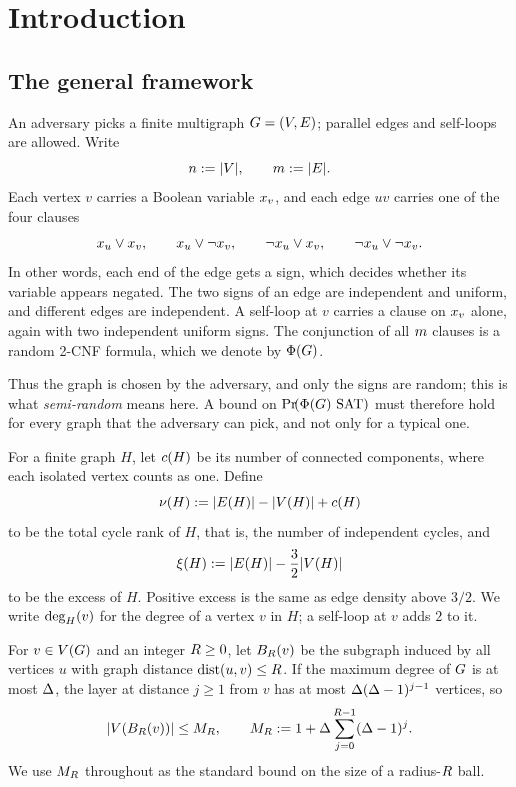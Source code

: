 \section{Introduction}\label{sec:overview}

\subsection{The general framework}\label{subsec:framework}


An adversary picks a finite multigraph \(G=(V,E)\); parallel edges
and self-loops are allowed. Write
\[
  n:=|V|,
  \qquad
  m:=|E|.
\]
Each vertex \(v\) carries a Boolean variable \(x_{v}\), and each edge \(uv\)
carries one of the four clauses
\[
  x_{u}\vee x_{v},
  \qquad
  x_{u}\vee\neg x_{v},
  \qquad
  \neg x_{u}\vee x_{v},
  \qquad
  \neg x_{u}\vee\neg x_{v} .
\]
In other words, each end of the edge gets a sign, which decides whether its
variable appears negated. The two signs of an edge are independent and uniform,
and different edges are independent. A self-loop at \(v\) carries a clause on
\(x_{v}\) alone, again with two independent uniform signs. The conjunction
of all \(m\) clauses is a random 2-CNF formula, which we denote by
\(\Phi(G)\).

Thus the graph is chosen by the adversary, and only the signs are random; this
is what \emph{semi-random} means here. A bound on \(\Prx{\rform{\Gin}\SAT}\)
must therefore hold for every graph that the adversary can pick, and not only
for a typical one.

For a finite graph \(H\), let \(c(H)\) be its number of connected
components, where each isolated vertex counts as one. Define
\[
  \nu(H):=|E(H)|-|V(H)|+c(H)
\]
to be the total cycle rank of \(H\), that is, the number of independent cycles,
and
\[
  \xi(H):=|E(H)|-\frac32|V(H)|
\]
to be the excess of \(H\). Positive excess is the same as edge density above
\(3/2\). We write \(\deg_{H}(v)\) for the degree of a vertex \(v\) in \(H\); a
self-loop at \(v\) adds \(2\) to it.

For \(v\in V(G)\) and an integer \(R\ge0\), let \(B_{R}(v)\) be the
subgraph induced by all vertices \(u\) with graph distance
\(\operatorname{dist}(u,v)\le R\).
If the maximum degree of \(G\) is at most \(\Delta\), the layer at distance
\(j\ge1\) from \(v\) has at most \(\Delta(\Delta-1)^{j-1}\) vertices, so
\[
  |V(B_{R}(v))|\le M_{R},
  \qquad
  M_{R}:=1+\Delta\sum_{j=0}^{R-1}(\Delta-1)^j .
\]
We use \(M_{R}\) throughout as the standard bound on the size of a
radius-\(R\) ball.

